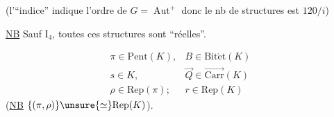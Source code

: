 (l’``indice'' indique l’ordre de \(G=\operatorname{Aut}^{+}\)\unsure{;|,} donc le nb de structures est \(120/i\))

\uline{NB} Sauf \(\mathrm I_4\), toutes ces structures sont ``réelles''.

\[\begin{array}{ll}
\pi\in\mathrm{Pent}(K),&B\in\mathrm{Bit\acute et}(K)\\
s\in K,&\vec Q\in\overrightarrow{\mathrm{Carr}}(K)\\
\rho\in\mathrm{Rep}(\pi);&r\in\mathrm{Rep}(K)
\end{array}\]
(\uline{NB} \(\{(\pi,\rho)\}\unsure{\simeq}\mathrm{Rep}(K)\)).
